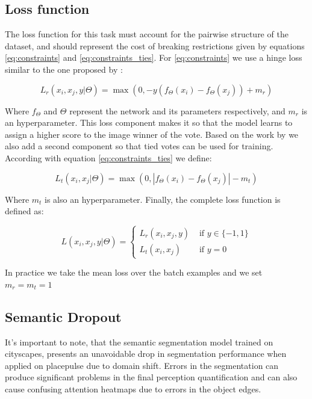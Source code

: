 \subsection{Loss function} \label{section:loss}
The loss function for this task must account for the pairwise structure of the dataset,
and should represent the cost of breaking restrictions given by equations
\ref{eq:constraints} and \ref{eq:constraints_ties}. For \ref{eq:constraints} we use
a hinge loss similar to the one proposed by :

\begin{equation}
	L_r(x_i,x_j,y | \Theta) = \max(0, -y(f_\Theta(x_i) - f_\Theta(x_j)) + m_r)
	\label{eq:r_loss}
\end{equation}

Where $f_\Theta$ and $\Theta$  represent the network and its parameters respectively, and $m_r$
is an hyperparameter. This loss component makes it so that the model learns to assign a higher
score to the image winner of the vote. Based on the work by  we also add a second component so that tied votes can
be used for training. According with equation \ref{eq:constraints_ties} we define:

\begin{equation}
	L_t(x_i,x_j | \Theta) = \max(0, |f_\Theta(x_i) - f_\Theta(x_j)| - m_t)
	\label{eq:t_loss}
\end{equation}

Where $m_t$ is also an hyperparameter. Finally, the complete loss function is defined as:

\begin{equation}
	L(x_i,x_j,y | \Theta) =\left\{\begin{matrix}
		L_r(x_i,x_j,y)&\text{ if } y \in \{-1,1\} \\
		L_t(x_i,x_j)&\text{ if } y=0
	\end{matrix}\right.
\end{equation}

In practice we take the mean loss over the batch examples and we set $m_r=m_t=1$

\subsection{Semantic Dropout}
It's important to note, that the semantic segmentation model trained on cityscapes,
presents an unavoidable drop in segmentation performance when applied on placepulse
due to domain shift. Errors in the segmentation can produce  significant problems
in the final perception quantification and can also cause confusing
attention heatmaps due to errors in the object edges.

